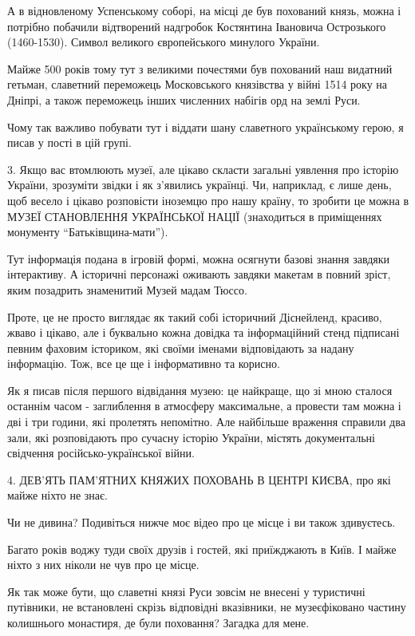 А в відновленому Успенському соборі, на місці де був похований князь, можна і
потрібно побачили відтворений надгробок Костянтина Івановича Острозького
(1460-1530). Символ великого європейського минулого України.

Майже 500 років тому тут з великими почестями був похований наш видатний
гетьман, славетний переможець Московського князівства у війні 1514 року на
Дніпрі, а також переможець інших численних набігів орд на землі Руси.

Чому так важливо побувати тут і віддати шану славетного українському герою, я
писав у пості в цій групі. 

3. Якщо вас втомлюють музеї, але цікаво скласти загальні уявлення про історію
України, зрозуміти звідки і як з’явились українці. Чи, наприклад, є лише день,
щоб весело і цікаво розповісти іноземцю про нашу країну, то зробити це можна в
МУЗЕЇ СТАНОВЛЕННЯ УКРАЇНСЬКОЇ НАЦІЇ (знаходиться в приміщеннях монументу
\enquote{Батьківщина-мати}).

Тут інформація подана в ігровій формі, можна осягнути базові знання завдяки
інтерактиву. А історичні персонажі оживають завдяки макетам в повний зріст,
яким позадрить знаменитий Музей мадам Тюссо. 

Проте, це не просто виглядає як такий собі історичний Діснейленд, красиво,
жваво і цікаво, але і буквально кожна довідка та інформаційний стенд підписані
певним фаховим істориком, які своїми іменами відповідають за надану інформацію.
Тож, все це ще і інформативно та корисно.

Як я писав після першого відвідання музею: це найкраще, що зі мною сталося
останнім часом - заглиблення в атмосферу максимальне, а провести там можна і
дві і три години, які пролетять непомітно. Але найбільше враження справили два
зали, які розповідають про сучасну історію України, містять документальні
свідчення російсько-української війни.


4. ДЕВ'ЯТЬ ПАМ'ЯТНИХ КНЯЖИХ ПОХОВАНЬ В ЦЕНТРІ КИЄВА, про які майже ніхто не знає.

Чи не дивина? Подивіться нижче моє відео про це місце і ви також здивуєтесь.

Багато років воджу туди своїх друзів і гостей, які приїжджають в Київ. І майже
ніхто з них ніколи не чув про це місце.

Як так може бути, що славетні князі Руси зовсім не внесені у туристичні
путівники, не встановлені скрізь відповідні вказівники, не музеєфіковано
частину колишнього монастиря, де були поховання? Загадка для мене. 

